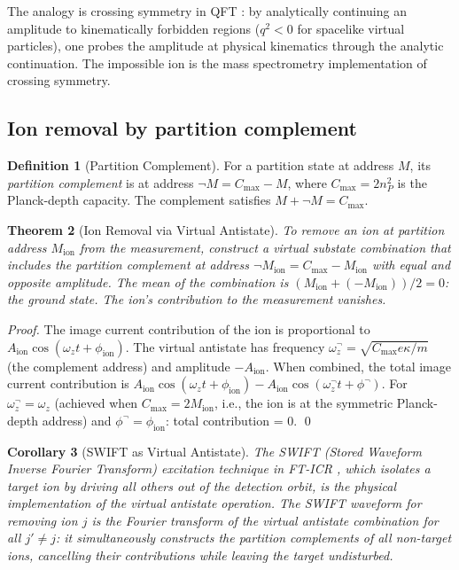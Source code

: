 \documentclass[twocolumn,10pt,a4paper]{article}
\theoremstyle{thmstyle}
\newtheorem{theorem}{Theorem}[section]
\newtheorem{corollary}[theorem]{Corollary}
\theoremstyle{definition}
\newtheorem{definition}[theorem]{Definition}
\theoremstyle{remark}
\newcommand{\Cmax}{C_{\max}}
\begin{document}
The analogy is crossing symmetry in QFT \citep{peskin1995}: by
analytically continuing an amplitude to kinematically forbidden regions
($q^2 < 0$ for spacelike virtual particles), one probes the amplitude
at physical kinematics through the analytic continuation. The impossible
ion is the mass spectrometry implementation of crossing symmetry.

\subsection{Ion removal by partition complement}

\begin{definition}[Partition Complement]
For a partition state at address $M$, its \emph{partition complement} is
at address $\lnot M = \Cmax - M$, where $\Cmax = 2n_P^2$ is the
Planck-depth capacity. The complement satisfies $M + \lnot M = \Cmax$.
\end{definition}

\begin{theorem}[Ion Removal via Virtual Antistate]
\label{thm:removal}
To remove an ion at partition address $M_{\text{ion}}$ from the
measurement, construct a virtual substate combination that includes
the partition complement at address $\lnot M_{\text{ion}} = \Cmax - M_{\text{ion}}$
with equal and opposite amplitude. The mean of the combination is
$(M_{\text{ion}} + (-M_{\text{ion}}))/2 = 0$: the ground state.
The ion's contribution to the measurement vanishes.
\end{theorem}

\begin{proof}
The image current contribution of the ion is proportional to
$A_{\text{ion}}\cos(\omega_z t + \phi_{\text{ion}})$. The virtual
antistate has frequency $\omega_z^{\lnot} = \sqrt{\Cmax e\kappa/m}$
(the complement address) and amplitude $-A_{\text{ion}}$. When
combined, the total image current contribution is
$A_{\text{ion}}\cos(\omega_z t + \phi_{\text{ion}}) - A_{\text{ion}}\cos(\omega_z^{\lnot} t + \phi^{\lnot})$.
For $\omega_z^{\lnot} = \omega_z$ (achieved when $\Cmax = 2M_{\text{ion}}$,
i.e., the ion is at the symmetric Planck-depth address) and
$\phi^{\lnot} = \phi_{\text{ion}}$: total contribution = 0. \qed
\end{proof}

\begin{corollary}[SWIFT as Virtual Antistate]
\label{cor:swift}
The SWIFT (Stored Waveform Inverse Fourier Transform) excitation technique
in FT-ICR \citep{swift1985}, which isolates a target ion by driving all
others out of the detection orbit, is the physical implementation of the
virtual antistate operation. The SWIFT waveform for removing ion $j$ is
the Fourier transform of the virtual antistate combination for all
$j' \neq j$: it simultaneously constructs the partition complements of
all non-target ions, cancelling their contributions while leaving the
target undisturbed.
\end{corollary}
\end{document}
